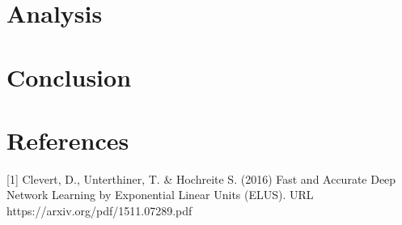 \documentclass{article}
\begin{document}
\section{Analysis}

\section{Conclusion}

\section{References}
\small
[1] Clevert, D., Unterthiner, T. & Hochreite S. (2016) Fast and Accurate Deep Network Learning by Exponential Linear Units (ELUS). URL https://arxiv.org/pdf/1511.07289.pdf
\end{document}
